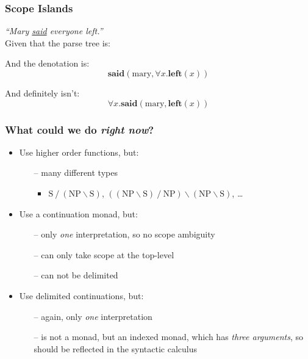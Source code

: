 \documentclass[11pt,t]{beamer}
\newcommand{\impl}     {\mathbin{\slash}}%
\newcommand{\impr}     {\mathbin{\backslash}}%
\newcommand{\tyS}      {\text{S}}%
\newcommand{\tyNP}     {\text{NP}}%
\begin{document}
\begin{frame}[label=scope-islands]
  \frametitle{Scope Islands}
  \textit{``Mary \underline{said} everyone left.''}
  \\[0.125\baselineskip]
  Given that the parse tree is:
  \\[1\baselineskip]
  \begin{center}
  \end{center}
  \begin{minipage}{0.5\linewidth}
    And the denotation is:
    $$\mathbf{said}(\text{mary},\forall x.\mathbf{left}(x))$$
  \end{minipage}%
  \begin{minipage}{0.5\linewidth}
    And definitely isn't:
    $$\forall x.\mathbf{said}(\text{mary},\mathbf{left}(x))$$
  \end{minipage}
  \vfill
\end{frame}

\begin{frame}
  \frametitle{What could we do \textit{right now}?}
  \vfill
  \begin{itemize}
    \item
          Use higher order functions, but:
          \begin{itemize}
            \item[--] many different types
                  \begin{itemize}
                    \item
                          $\tyS\impl(\tyNP\impr\tyS)$,
                          $((\tyNP\impr\tyS)\impl\tyNP)\impr(\tyNP\impr\tyS)$,
                          \ldots
                  \end{itemize}
          \end{itemize}
    \item
          Use a continuation monad, but:
          \begin{itemize}
            \item[--] only \textit{one} interpretation, so no scope ambiguity
            \item[--] can only take scope at the top-level
            \item[--] can not be delimited
          \end{itemize}
    \item
          Use delimited continuations, but:
          \begin{itemize}
            \item[--] again, only \textit{one} interpretation
            \item[--] is not a monad, but an indexed monad, which has
                  \textit{three arguments}, so should be reflected in the
                  syntactic calculus
          \end{itemize}
  \end{itemize}
  \vfill
\end{frame}
\end{document}
